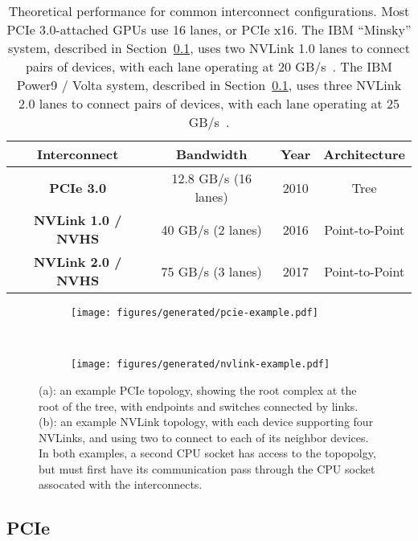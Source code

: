 \begin{table}[h]
	\centering
	\caption[Interconnect Performance Summary]{
		Theoretical performance for common interconnect configurations.
		Most PCIe 3.0-attached GPUs use 16 lanes, or PCIe x16.
		The IBM ``Minsky'' system, described in Section~\ref{}, uses two NVLink 1.0 lanes to connect pairs of devices, with each lane operating at 20 GB/s~\cite{nvidia2016p100}.
		The IBM Power9 / Volta system, described in Section~\ref{}, uses three NVLink 2.0 lanes to connect pairs of devices, with each lane operating at 25 GB/s~\cite{nvidia2017v100}.
	}
	\label{tab:interconnect-overview}
	\begin{tabular}{|c|c|c|c|}
		\hline
		\textbf{Interconnect} & \textbf{Bandwidth}  & \textbf{Year} & \textbf{Architecture}\\ \hline
		\textbf{PCIe 3.0}          & 12.8 GB/s (16 lanes) & 2010 & Tree   \\ \hline
		\textbf{NVLink 1.0 / NVHS} &   40 GB/s (2 lanes)  & 2016 & Point-to-Point \\ \hline
		\textbf{NVLink 2.0 / NVHS} &   75 GB/s (3 lanes)  & 2017 & Point-to-Point \\ \hline
	\end{tabular}
\end{table}

\begin{figure}[ht]
    \centering
	\begin{subfigure}[b]{0.4\textwidth}
		\texttt{[image: figures/generated/pcie-example.pdf]}
		\caption[]{}
		\label{fig:pcie-cartoon}
    \end{subfigure}
    ~
    \begin{subfigure}[b]{0.4\textwidth}
		\texttt{[image: figures/generated/nvlink-example.pdf]}
		\caption[]{}
		\label{fig:pcie-cartoon}
    \end{subfigure}
    \caption[Example PCIe and NVLink interconnect topologies]{
		(a): an example PCIe topology, showing the root complex at the root of the tree, with endpoints and switches connected by links.
		(b): an example NVLink topology, with each device supporting four NVLinks, and using two to connect to each of its neighbor devices.
		In both examples, a second CPU socket has access to the topopolgy, but must first have its communication pass through the CPU socket assocated with the interconnects.
	}
    \label{fig:interconnect-cartoon}
\end{figure}

\subsection{PCIe}

